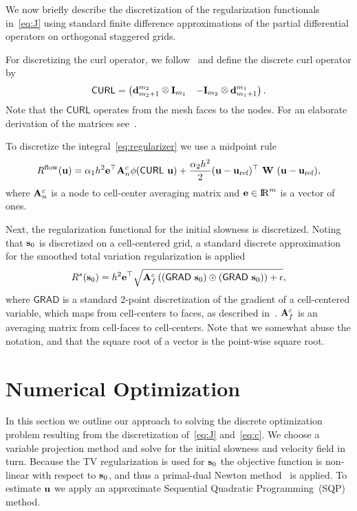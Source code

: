 \documentclass[english]{siamltex}
\newcommand {\R}    {{\rm I\!R}}
\newcommand {\bu}   { {\bf u} }          			%
\newcommand {\buref}   { {\bf u}_{\text{ref}} } 	%
\newcommand {\bfe}   { {\bf e} }
\newcommand {\bfs}   { {\bf s} }
\newcommand {\bfu}   { {\bf u} }
\newcommand {\bfA}  { {\bf A} }
\newcommand{\CURLh}  {{\textsf{CURL}}} %
\newcommand{\GRADh}  {{\textsf{GRAD}}} %
\newcommand{\W}{\text{\bf W}}
\def\kronecker{\raisebox{1pt}{\ensuremath{\:\otimes\:}}}
\begin{document}
We now briefly describe the discretization of the regularization
 functionals in~\eqref{eq:J} using standard finite difference approximations 
 of the partial differential operators on orthogonal staggered grids. 

For discretizing the curl operator, we follow~\cite{ha} and define the discrete curl operator by
\begin{equation}
	\CURLh = \begin{pmatrix}
					 {\bf d}_{m_{2}+1}^{m_{2}} \kronecker {\bf I}_{m_{1}} &
					  -{\bf I}_{m_{2}} \kronecker {\bf d}_{m_{1}+1}^{m_{1}}
				\end{pmatrix}.
\end{equation}
Note that the $\CURLh$  operates from the mesh faces to the nodes.
For an elaborate derivation of the matrices see~\cite{ha,ModSiamBook}.

\bigskip

To discretize the integral~\eqref{eq:regularizer} we use a midpoint rule
\begin{eqnarray}
	R^{\rm flow}(\bu) =  \alpha_1 h^2 \bfe^{\top} \bfA_{n}^{c} \phi(\CURLh\  \bfu) + \frac{\alpha_2 h^2}{2} (\bfu-\buref)^{\top}\ \W\ (\bu-\buref),
\end{eqnarray}
where $\bfA_{n}^{c}$ is a node to cell-center averaging matrix and $\bfe\in\R^m$ is a vector of ones.

\bigskip

Next, the regularization functional  for the initial slowness is discretized. 
Noting that $\bfs_0$ is discretized on a cell-centered grid, a standard discrete 
approximation for the smoothed total variation regularization is applied~\cite{ahh}
\begin{equation}
\label{regsd}
R^{s}(\bfs_{0}) = h^2 \bfe^{\top} \sqrt{ \bfA_{f}^{c} \left( (\GRADh\ \bfs_{0}) \odot (\GRADh\ \bfs_{0}) \right)  + \epsilon},
\end{equation}
where $\GRADh$ is a standard 2-point discretization of the gradient of a cell-centered variable, which maps from cell-centers to faces, as described in~\cite{ha,ahh}.
$\bfA_{f}^{c}$ is an averaging matrix from cell-faces to cell-centers.
Note that we somewhat abuse the notation, and that the square root of a vector is the point-wise square root.




\section{Numerical Optimization}
In this section we outline our approach to solving the discrete optimization problem resulting from the discretization of~\eqref{eq:J}  and~\eqref{eq:c}. We choose a variable projection method and solve for the initial slowness and velocity field in turn. Because the TV regularization is used for $\bfs_{0}$ the objective function is non-linear with respect to $\bfs_{0}$, and thus  a primal-dual Newton method~\cite{cgm} is applied. To estimate $\bfu$ we apply an approximate Sequential Quadratic Programming~(SQP) method. 
\label{sec:numerical_optimization}
\end{document}
